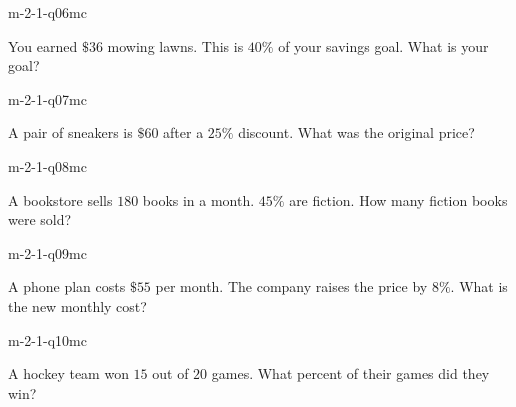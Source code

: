 \begin{practiceQuestion}{m-2-1-q06}{mc}
\begin{questionText}
You earned $\$36$ mowing lawns. This is $40\%$ of your savings goal. What is your goal?
\end{questionText}
\end{practiceQuestion}

\begin{practiceQuestion}{m-2-1-q07}{mc}
\begin{questionText}
A pair of sneakers is $\$60$ after a $25\%$ discount. What was the original price?
\end{questionText}
\end{practiceQuestion}

\begin{practiceQuestion}{m-2-1-q08}{mc}
\begin{questionText}
A bookstore sells $180$ books in a month. $45\%$ are fiction. How many fiction books were sold?
\end{questionText}
\end{practiceQuestion}

\begin{practiceQuestion}{m-2-1-q09}{mc}
\begin{questionText}
A phone plan costs $\$55$ per month. The company raises the price by $8\%$. What is the new monthly cost?
\end{questionText}
\end{practiceQuestion}

\begin{practiceQuestion}{m-2-1-q10}{mc}
\begin{questionText}
A hockey team won $15$ out of $20$ games. What percent of their games did they win?
\end{questionText}
\end{practiceQuestion}


